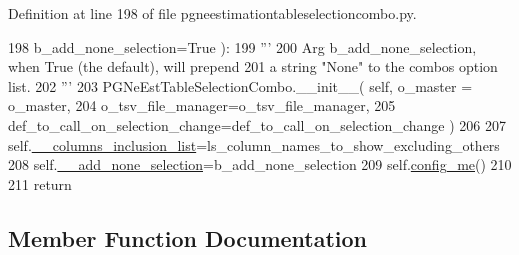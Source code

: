 Definition at line 198 of file pgneestimationtableselectioncombo.\+py.


\begin{DoxyCode}
198                         b\_add\_none\_selection=\textcolor{keyword}{True} ):
199         \textcolor{stringliteral}{'''}
200 \textcolor{stringliteral}{        Arg b\_add\_none\_selection, when True (the default), will prepend}
201 \textcolor{stringliteral}{        a string "None" to the combos option list.}
202 \textcolor{stringliteral}{        '''}
203         PGNeEstTableSelectionCombo.\_\_init\_\_( self, o\_master = o\_master, 
204                                     o\_tsv\_file\_manager=o\_tsv\_file\_manager,
205                                     def\_to\_call\_on\_selection\_change=def\_to\_call\_on\_selection\_change )
206 
207         self.\hyperlink{classnegui_1_1pgneestimationtableselectioncombo_1_1PGNeEstTableColumnSelectionCombo_a765a8b0d14db5153d5bef34d6c27e71a}{\_\_columns\_inclusion\_list}=ls\_column\_names\_to\_show\_excluding\_others
208         self.\hyperlink{classnegui_1_1pgneestimationtableselectioncombo_1_1PGNeEstTableColumnSelectionCombo_a841bc92b65f36109283b2dd90ca1e655}{\_\_add\_none\_selection}=b\_add\_none\_selection
209         self.\hyperlink{classnegui_1_1pgneestimationtableselectioncombo_1_1PGNeEstTableSelectionCombo_a896e448cd14e9a4b8daaf7e599f48f7b}{config\_me}()
210 
211         \textcolor{keywordflow}{return}
\end{DoxyCode}


\subsection{Member Function Documentation}
